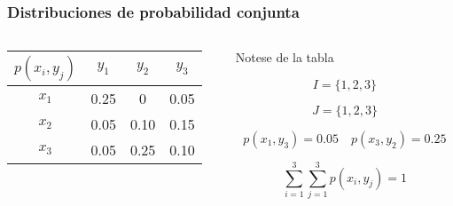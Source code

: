 \documentclass[spanish]{beamer}
\begin{document}
\begin{frame}
\frametitle{Distribuciones de probabilidad conjunta}
\begin{columns}
\begin{column}{0.5\textwidth}
\begin{center}
\begin{tabular}{ c c c c } 
\hline
$p(x_{i},y_{j})$ & $y_{1}$ & $y_{2}$ & $y_{3}$\\
 \hline
 $x_{1}$ & 0.25 & 0  & 0.05\\ 
 $x_{2}$ & 0.05 & 0.10 & 0.15\\ 
 $x_{3}$ & 0.05 & 0.25 & 0.10\\ 
 \hline
\end{tabular}
\end{center}
\end{column}


\begin{column}{0.5\textwidth}
Notese de la tabla

\begin{equation*}
I = \lbrace 1,2,3  \rbrace 
\end{equation*}

\begin{equation*}
J = \lbrace 1,2,3  \rbrace
\end{equation*}

\begin{equation*}
p(x_{1} , y_{3} ) = 0.05 \quad p(x_{3} , y_{2} ) = 0.25
\end{equation*}

\begin{equation*}
\sum_{i=1}^3 \sum_{j=1}^3 p(x_{i} , y_{j} ) = 1
\end{equation*}



\end{column}
\end{columns}

\end{frame}
\end{document}
